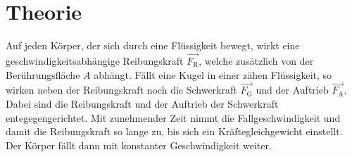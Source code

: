 \section{Theorie}
\label{sec:Theorie}
Auf jeden Körper, der sich durch eine Flüssigkeit bewegt, wirkt eine
geschwindigkeitsabhängige Reibungskraft $\vec{F_\text{R}}$, welche zusätzlich
von der Berührungsfläche $A$ abhängt. Fällt eine Kugel in einer zähen Flüssigkeit,
so wirken neben der Reibungskraft noch die Schwerkraft $\vec{F_\text{G}}$ und
der Auftrieb $\vec{F_\text{A}}$. Dabei sind die Reibungskraft und der Auftrieb
der Schwerkraft entegegengerichtet. Mit zunehmender Zeit nimmt die Fallgeschwindigkeit
und damit die Reibungskraft so lange zu, bis sich ein Kräftegleichgewicht einstellt.
Der Körper fällt dann mit konstanter Geschwindigkeit weiter.
\cite{sample}
